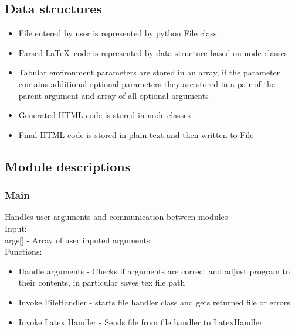 \subsection{Data structures}
\begin{itemize}
\item File entered by user is represented by python File class 
\item Parsed \LaTeX \, code is represented by data structure based on node classes 
\item Tabular environment parameters are stored in an array, if the parameter contains additional optional parameters they are stored in a pair of the parent argument and array of all optional arguments 
\item Generated HTML code is stored in node classes 
\item Final HTML code is stored in plain text and then written to File
\end{itemize}

\subsection{Module descriptions}
\subsubsection{Main}
Handles user arguments and communication between modules \\ 
Input: \\ 
args[] - Array of user inputed arguments \\ 
Functions: 
\begin{itemize}
    \item Handle arguments - Checks if arguments are correct and adjust program to their contents, in particular saves tex file path
    \item Invoke FileHandler - starts file handler class and gets returned file or errors 
    \item Invoke Latex Handler - Sends file from file handler to LatexHandler 
\end{itemize}
